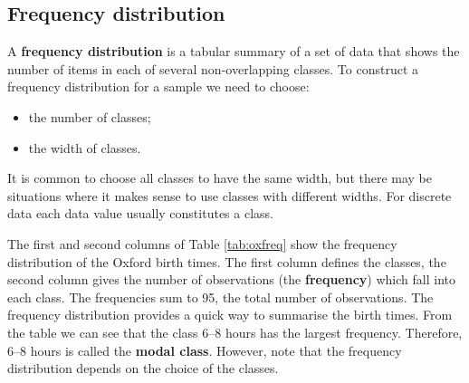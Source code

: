 \documentclass[
  british,
]{book}
\providecommand{\tightlist}{%
  \setlength{\itemsep}{0pt}\setlength{\parskip}{0pt}}
\begin{document}
\hypertarget{frequency-distribution}{%
\subsection{Frequency distribution}\label{frequency-distribution}}

A \textbf{frequency distribution} is a tabular summary of a set of data that shows the number of items in each of several non-overlapping classes. To construct a frequency distribution for a sample we need to choose:

\begin{itemize}
\tightlist
\item
  the number of classes;
\item
  the width of classes.
\end{itemize}

It is common to choose all classes to have the same width, but there may be situations where it makes sense to use classes with different widths. For
discrete data each data value usually constitutes a class.

The first and second columns of Table \ref{tab:oxfreq} show the frequency distribution of the Oxford birth times. The first column defines the classes, the second column gives the number of observations (the \textbf{frequency}) which fall into each class. The frequencies sum to 95, the total number of observations. The frequency distribution provides a quick way to summarise the birth times. From the table we can see that the class 6--8 hours has the largest frequency. Therefore, 6--8 hours is called the \textbf{modal class}. However, note that the frequency distribution depends on the choice of the classes.
\end{document}
